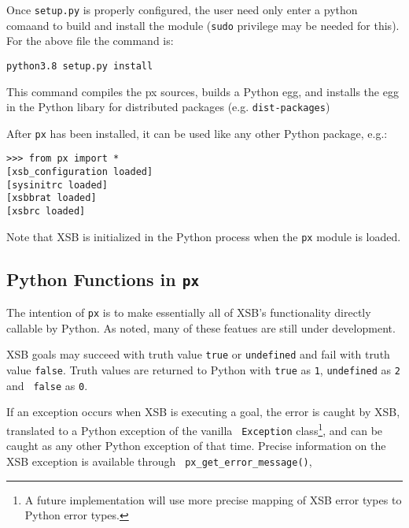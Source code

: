 Once {\tt setup.py} is properly configured, the user need only enter a
python comaand to build and install the module ({\tt sudo} privilege
may be needed for this).  For the above file the command is:

\begin{verbatim}
python3.8 setup.py install
\end{verbatim}
\noindent
This command compiles the px sources, builds a Python egg, and
installs the egg in the Python libary for distributed packages
(e.g. {\tt dist-packages})

After {\tt px} has been installed, it can be used like any other Python
package, e.g.:

\begin{verbatim}
>>> from px import *
[xsb_configuration loaded]
[sysinitrc loaded]
[xsbbrat loaded]
[xsbrc loaded]
\end{verbatim}
\noindent
Note that XSB is initialized in the Python process when the {\tt px}
module is loaded.

\subsection{Python Functions in {\tt px}}

The intention of {\tt px} is to make essentially all of XSB's
functionality directly callable by Python.  As noted, many of these
featues are still under development.

XSB goals may succeed with truth value {\tt true} or {\tt undefined}
and fail with truth value {\tt false}.  Truth values are returned to
Python with {\tt true} as {\tt 1}, {\tt undefined} as {\tt 2} and {\tt
  false} as {\tt 0}.

If an exception occurs when XSB is executing a goal, the error is
caught by XSB, translated to a Python exception of the vanilla {\tt
  Exception} class\footnote{A future implementation will use more
  precise mapping of XSB error types to Python error types.}, and can
be caught as any other Python exception of that time.  Precise
information on the XSB exception is available through {\tt
  px\_get\_error\_message()},


